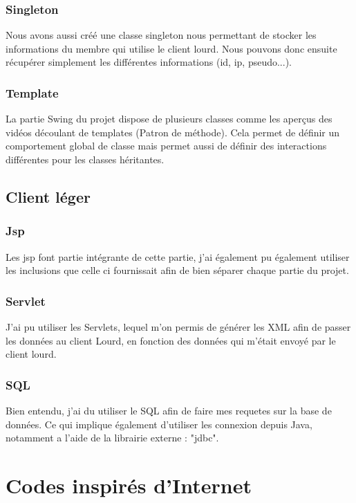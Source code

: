 \documentclass{article}
\begin{document}
\subsubsection{Singleton}
Nous avons aussi créé une classe singleton nous permettant de stocker les informations du membre qui utilise le client lourd. Nous pouvons donc ensuite récupérer simplement les différentes informations (id, ip, pseudo...).

\subsubsection{Template}
La partie Swing du projet dispose de plusieurs classes comme les aperçus des vidéos découlant de templates (Patron de méthode). Cela permet de définir un comportement global de classe mais permet aussi de définir des interactions différentes pour les classes héritantes.

\subsection{Client léger}

\subsubsection{Jsp}
Les jsp font partie intégrante de cette partie, j'ai également pu également utiliser les inclusions que celle ci fournissait afin de bien séparer chaque partie du projet.

\subsubsection{Servlet}
J'ai pu utiliser les Servlets, lequel m'on permis de générer les XML afin de passer les données au client Lourd, en fonction des données qui m'était envoyé par le client lourd.\\

\subsubsection{SQL}
Bien entendu, j'ai du utiliser le SQL afin de faire mes requetes sur la base de données. Ce qui implique également d'utiliser les connexion depuis Java, notamment a l'aide de la librairie externe : "jdbc".\\

\section{Codes inspirés d'Internet}
\end{document}
